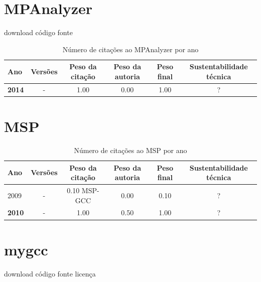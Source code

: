 \section{MPAnalyzer}
\checkmark download
\checkmark código fonte



\begin{table}[H]
\caption{Número de citações ao MPAnalyzer por ano}
\centering
\begin{tabular}{| l | c | c | c | c | c |}
  \hline
  Ano & Versões & Peso da citação & Peso da autoria & Peso final & Sustentabilidade técnica \\
  \hline
            {\bf 2014}
          &
          -
          &
          1.00
          &
          0.00
          &
            {\color{blue} 1.00}
          &
          ?
          \\
\hline
\end{tabular}
\end{table}



\section{MSP}



\begin{table}[H]
\caption{Número de citações ao MSP por ano}
\centering
\begin{tabular}{| l | c | c | c | c | c |}
  \hline
  Ano & Versões & Peso da citação & Peso da autoria & Peso final & Sustentabilidade técnica \\
  \hline
            2009
          &
          -
          &
          0.10
            {\tiny MSP-GCC}
          &
          0.00
          &
            {\color{red} 0.10}
          &
          ?
          \\
\hline
            {\bf 2010}
          &
          -
          &
          1.00
          &
          0.50
          &
            {\color{blue} 1.00}
          &
          ?
          \\
\hline
\end{tabular}
\end{table}



\section{mygcc}
\checkmark download
\checkmark código fonte
\checkmark licença



